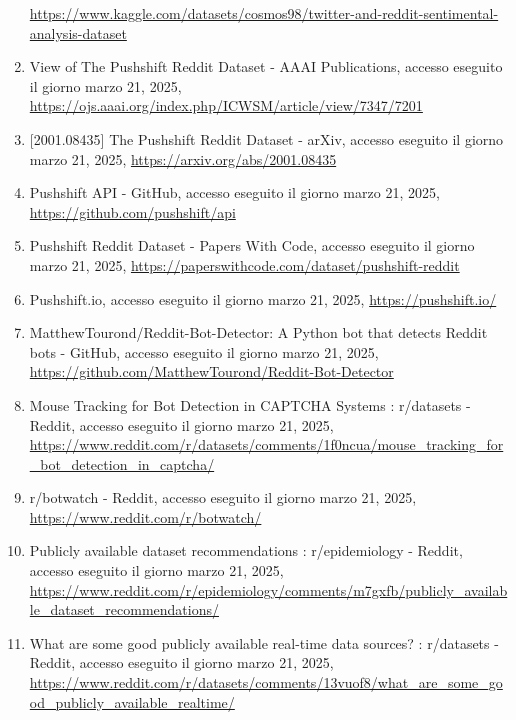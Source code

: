 \documentclass[
  12pt,
  letterpaper,
  DIV=11,
  numbers=noendperiod]{scrartcl}
\begin{document}
\begin{enumerate}
  \url{https://www.kaggle.com/datasets/cosmos98/twitter-and-reddit-sentimental-analysis-dataset}\\
\item
  View of The Pushshift Reddit Dataset - AAAI Publications, accesso
  eseguito il giorno marzo 21, 2025,
  \url{https://ojs.aaai.org/index.php/ICWSM/article/view/7347/7201}\\
\item
  {[}2001.08435{]} The Pushshift Reddit Dataset - arXiv, accesso
  eseguito il giorno marzo 21, 2025,
  \url{https://arxiv.org/abs/2001.08435}\\
\item
  Pushshift API - GitHub, accesso eseguito il giorno marzo 21, 2025,
  \url{https://github.com/pushshift/api}\\
\item
  Pushshift Reddit Dataset - Papers With Code, accesso eseguito il
  giorno marzo 21, 2025,
  \url{https://paperswithcode.com/dataset/pushshift-reddit}\\
\item
  Pushshift.io, accesso eseguito il giorno marzo 21, 2025,
  \url{https://pushshift.io/}\\
\item
  MatthewTourond/Reddit-Bot-Detector: A Python bot that detects Reddit
  bots - GitHub, accesso eseguito il giorno marzo 21, 2025,
  \url{https://github.com/MatthewTourond/Reddit-Bot-Detector}\\
\item
  Mouse Tracking for Bot Detection in CAPTCHA Systems : r/datasets -
  Reddit, accesso eseguito il giorno marzo 21, 2025,
  \url{https://www.reddit.com/r/datasets/comments/1f0ncua/mouse_tracking_for_bot_detection_in_captcha/}\\
\item
  r/botwatch - Reddit, accesso eseguito il giorno marzo 21, 2025,
  \url{https://www.reddit.com/r/botwatch/}\\
\item
  Publicly available dataset recommendations : r/epidemiology - Reddit,
  accesso eseguito il giorno marzo 21, 2025,
  \url{https://www.reddit.com/r/epidemiology/comments/m7gxfb/publicly_available_dataset_recommendations/}\\
\item
  What are some good publicly available real-time data sources? :
  r/datasets - Reddit, accesso eseguito il giorno marzo 21, 2025,
  \url{https://www.reddit.com/r/datasets/comments/13vuof8/what_are_some_good_publicly_available_realtime/}\\

\end{enumerate}
\end{document}
